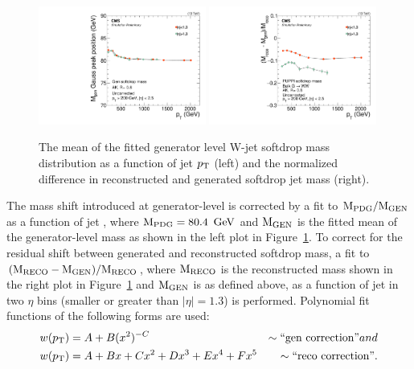 \begin{figure}[h!]
\centering
\includegraphics[width=0.49\textwidth]{figures/analysis/search2/AN-16-235/plots/GenSoftdropMass_vspt.pdf}
\includegraphics[width=0.49\textwidth]{figures/analysis/search2/AN-16-235/plots/MassShift_vspt.pdf}
\caption{The mean of the fitted generator level W-jet softdrop mass distribution as a function of jet $p_{\mathrm{T}}$ (left) and the normalized difference in reconstructed and generated softdrop jet mass (right).}
\label{fig:searchII:sdmassshifts}
\end{figure}
The mass shift introduced at generator-level is corrected by a fit to $\rm{M_{PDG}/M_{GEN}}$ as a function of jet \PT, where $\rm{M_{PDG}}=80.4~\,\text{Ge\hspace{-.08em}V}$ and $\rm{M_{GEN}}$ is the fitted mean of the generator-level mass as shown in the left plot in Figure~\ref{fig:searchII:sdmassshifts}. To correct for the residual shift between generated and reconstructed softdrop mass, a fit to $\rm{(M_{RECO}-M_{GEN})/M_{RECO}}$, where $\rm{M_{RECO}}$ is the reconstructed mass shown in the right plot in Figure~\ref{fig:searchII:sdmassshifts} and $\rm{M_{GEN}}$ is as defined above, as a function of jet \PT in two $\eta$ bins (smaller or greater than $|\eta|=1.3$) is performed.
Polynomial fit functions of the following forms are used:
\begin{align*} 
w(p_{\mathrm{T}}) &=  A  +B(x^{2})^{-C}          &\sim\textrm{``gen correction''} and\\
w(p_{\mathrm{T}}) &=  A  +Bx+Cx^2+Dx^3+Ex^4+Fx^5 &\sim\textrm{``reco correction''}. 
\end{align*}
